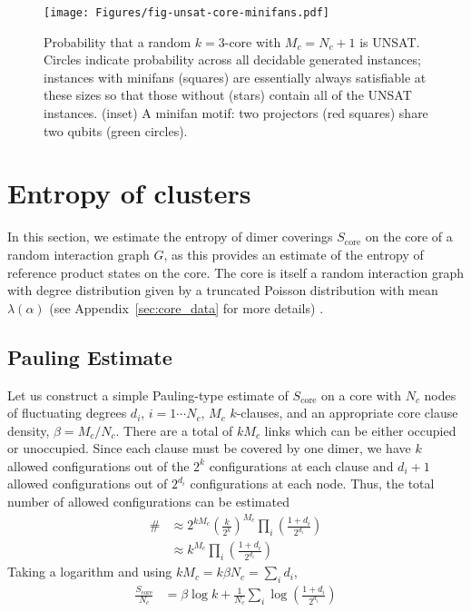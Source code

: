 \documentclass[aps,pra,twocolumn,superscriptaddress,amsmath]{revtex4-1}
\newcommand{\Sc}{S_{\mathrm{core}}}
\begin{document}
\begin{figure}[tb]
	\centering
	\texttt{[image: Figures/fig-unsat-core-minifans.pdf]}
	\caption{Probability that a random $k=3$-core with $M_c = N_c+1$ is UNSAT. 
	Circles indicate probability across all decidable generated instances; 
	instances with minifans (squares) are essentially always satisfiable at these sizes so that those without (stars) contain all of the UNSAT instances.
	(inset) A minifan motif: two projectors (red squares) share two qubits (green circles).
	}
	\label{fig:unsat-cores-minifans}
\end{figure}





\section{Entropy of clusters} %
\label{sec:counting_dimer_covering_states}

In this section, we estimate the entropy of dimer coverings $\Sc$ on the core of a random interaction graph $G$, as this provides an estimate of the entropy of reference product states on the core. 
The core is itself a random interaction graph with degree distribution given by a truncated Poisson distribution with mean $\lambda(\alpha)$ (see Appendix~\ref{sec:core_data} for more details) \cite{Mezard2003}. 


\subsection{Pauling Estimate} %
\label{sub:pauling_estimate}

Let us construct a simple Pauling-type estimate of $\Sc$ on a core with $N_c$ nodes of fluctuating degrees $d_i$, $i = 1 \cdots N_c$, $M_c$ $k$-clauses, and an appropriate core clause density, $\beta=M_c/N_c$. 
There are a total of $kM_c$ links which can be either occupied or unoccupied. Since each clause must be covered by one dimer, we have $k$ allowed configurations out of the $2^k$ configurations at each clause and $d_i + 1$ allowed configurations out of $2^{d_i}$ configurations at each node. Thus, the total number of allowed configurations can be estimated 
\begin{align}
\# &\approx 2^{kM_c} \left( \frac{k}{2^k}\right)^{M_c} \prod_{i} \left( \frac{1+d_i}{2^{d_i}}\right)\\
&\approx k^{M_c} \prod_{i} \left( \frac{1+d_i}{2^{d_i}}\right)
\end{align}
Taking a logarithm and using $k M_c = k \beta N_c = \sum_i d_i$,
\begin{align}
	\frac{\Sc}{N_c} &= \beta \log k + \frac{1}{N_c}\sum_i \log \left(\frac{1 + d_i}{2^{d_i}}\right)
\end{align}
\end{document}
